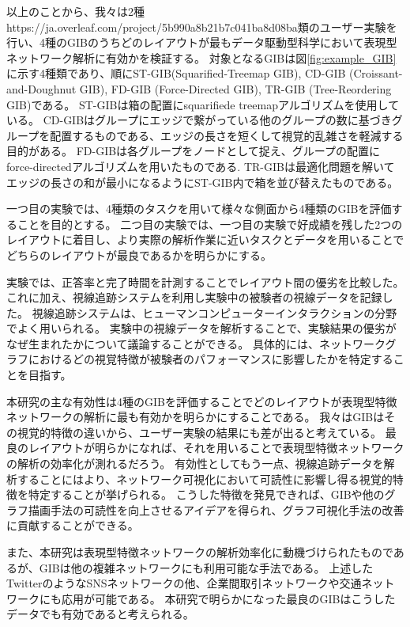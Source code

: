 \documentclass{kuee}
\begin{document}
以上のことから、我々は2種https://ja.overleaf.com/project/5b990a8b21b7c041ba8d08ba類のユーザー実験を行い、4種のGIBのうちどのレイアウトが最もデータ駆動型科学において表現型ネットワーク解析に有効かを検証する。
対象となるGIBは図\ref{fig:example_GIB}に示す4種類であり、順にST-GIB(Squarified-Treemap GIB), CD-GIB (Croissant-and-Doughnut GIB), FD-GIB (Force-Directed GIB), TR-GIB (Tree-Reordering GIB)である。
ST-GIBは箱の配置にsquarifiede treemapアルゴリズム\cite{bruls2000squarified}を使用している。
CD-GIBはグループにエッジで繋がっている他のグループの数に基づきグループを配置するものである、エッジの長さを短くして視覚的乱雑さを軽減する目的がある\cite{chaturvedi2014group}。
FD-GIBは各グループをノードとして捉え、グループの配置にforce-directedアルゴリズムを用いたものである\cite{chaturvedi2014group}.
TR-GIBは最適化問題を解いてエッジの長さの和が最小になるようにST-GIB内で箱を並び替えたものである。

一つ目の実験では、4種類のタスクを用いて様々な側面から4種類のGIBを評価することを目的とする。
二つ目の実験では、一つ目の実験で好成績を残した2つのレイアウトに着目し、より実際の解析作業に近いタスクとデータを用いることでどちらのレイアウトが最良であるかを明らかにする。

実験では、正答率と完了時間を計測することでレイアウト間の優劣を比較した。
これに加え、視線追跡システムを利用し実験中の被験者の視線データを記録した。
視線追跡システムは、ヒューマンコンピューターインタラクションの分野でよく用いられる。
実験中の視線データを解析することで、実験結果の優劣がなぜ生まれたかについて議論することができる\cite{andrienko2012visual,duchowski2007eye,kurzhals2014evaluating}。
具体的には、ネットワークグラフにおけるどの視覚特徴が被験者のパフォーマンスに影響したかを特定することを目指す。

本研究の主な有効性は4種のGIBを評価することでどのレイアウトが表現型特徴ネットワークの解析に最も有効かを明らかにすることである。
我々はGIBはその視覚的特徴の違いから、ユーザー実験の結果にも差が出ると考えている。
最良のレイアウトが明らかになれば、それを用いることで表現型特徴ネットワークの解析の効率化が測れるだろう。
有効性としてもう一点、視線追跡データを解析することにはより、ネットワーク可視化において可読性に影響し得る視覚的特徴を特定することが挙げられる。
こうした特徴を発見できれば、GIBや他のグラフ描画手法の可読性を向上させるアイデアを得られ、グラフ可視化手法の改善に貢献することができる。

また、本研究は表現型特徴ネットワークの解析効率化に動機づけられたものであるが、GIBは他の複雑ネットワークにも利用可能な手法である。
上述したTwitterのようなSNSネットワークの他、企業間取引ネットワークや交通ネットワークにも応用が可能である。
本研究で明らかになった最良のGIBはこうしたデータでも有効であると考えられる。
\end{document}
